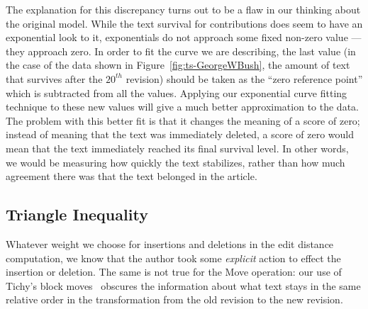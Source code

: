 The explanation for this discrepancy turns out to be a flaw in our
thinking about the original model.
While the text survival for contributions does seem to have an
exponential look to it, exponentials do not approach some fixed
non-zero value --- they approach zero.
In order to fit the curve we are describing, the last value
(in the case of the data shown in Figure~\ref{fig:ts-GeorgeWBush},
the amount of text that survives after the $20^{th}$ revision)
should be taken as the ``zero reference point'' which is subtracted
from all the values.
Applying our exponential curve fitting technique to these new values
will give a much better approximation to the data.
The problem with this better fit is that it changes the meaning of
a score of zero; instead of meaning that the text was immediately deleted,
a score of zero would mean that the text immediately reached its
final survival level.
In other words, we would be measuring how quickly the text stabilizes,
rather than how much agreement there was that the text belonged in
the article.

\subsection{Triangle Inequality}


Whatever weight we choose for insertions and deletions in the edit
distance computation, we know that the author took some
\textit{explicit} action to effect the insertion or deletion.
The same is not true for the Move operation: our use of
Tichy's block moves~\cite{Tichy1984} obscures the information
about what text stays in the same relative order in the
transformation from the old revision to the new revision.


